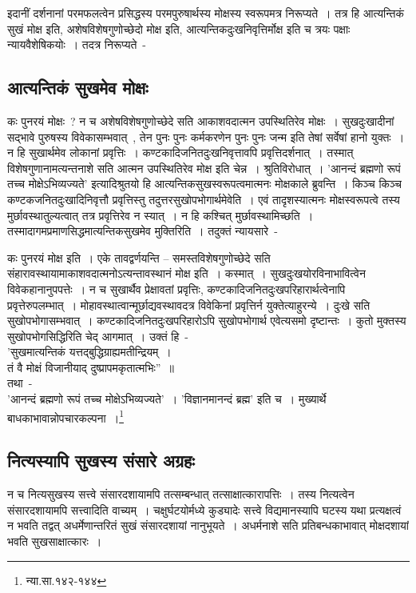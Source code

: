 	इदानीं दर्शनानां परमफलत्वेन प्रसिद्धस्य परमपुरुषार्थस्य मोक्षस्य स्वरूपमत्र निरूप्यते~। तत्र हि आत्यन्तिकं सुखं मोक्ष इति, अशेषविशेषगुणोच्छेदो मोक्ष इति, आत्यन्तिकदुःखनिवृत्तिर्मोक्ष इति च त्रयः पक्षाः न्यायवैशेषिकयोः~। तदत्र निरूप्यते~- 

		\subsection{आत्यन्तिकं सुखमेव मोक्षः}

		कः पुनरयं मोक्षः~? न च अशेषविशेषगुणोच्छेदे सति आकाशवदात्मन उपस्थितिरेव मोक्षः~।‌ सुखदुःखादीनां सद्भावे पुरुषस्य विवेकासम्भवात्~, तेन पुनः पुनः कर्मकरणेन पुनः पुनः जन्म इति तेषां सर्वेषां हानो युक्तः~। न हि सुखार्थमेव लोकानां प्रवृत्तिः~। कण्टकादिजनितदुःखनिवृत्तावपि प्रवृत्तिदर्शनात्~। तस्मात् विशेषगुणानामत्यन्तनाशे सति आत्मन उपस्थितिरेव मोक्ष इति चेन्न~। श्रुतिविरोधात्~। ’आनन्दं ब्रह्मणो रूपं तच्च मोक्षेऽभिव्यज्यते’ इत्यादिश्रुतयो हि आत्यन्तिकसुखस्वरूपत्वमात्मनः मोक्षकाले ब्रुवन्ति~। किञ्च किञ्च कण्टकजनितदुःखादिनिवृत्तौ प्रवृत्तिस्तु तदुत्तरसुखोपभोगार्थमेवेति~। एवं तादृशस्यात्मनः मोक्षस्वरूपत्वे तस्य मुर्छावस्थातुल्यत्वात् तत्र प्रवृत्तिरेव न स्यात्~। न हि कश्चित् मुर्छावस्थामिच्छति~। तस्मादागमप्रमाणसिद्धमात्यन्तिकसुखमेव मुक्तिरिति~। तदुक्तं न्यायसारे~-

		{\fontsize{11.7}{0}\selectfont\s कः पुनरयं मोक्ष इति~। एके तावद्वर्णयन्ति – समस्तविशेषगुणोच्छेदे सति संहारावस्थायामाकाशवदात्मनोऽत्यन्तावस्थानं मोक्ष इति~। कस्मात्~। सुखदुःखयोरविनाभावित्वेन विवेकहानानुपपत्तेः~। न च सुखार्थैव प्रेक्षावतां प्रवृत्तिः, कण्टकादिजनितदुःखपरिहारार्थत्वेनापि प्रवृत्तेरुपलम्भात्~। मोहावस्थात्वान्मूर्छाद्यवस्थावदत्र विवेकिनां प्रवृत्तिर्न युक्तेत्याहुरन्ये~। दुःखे सति सुखोपभोगासम्भवात्~। कण्टकादिजनितदुःखपरिहारोऽपि सुखोपभोगार्थ एवेत्यसमो दृष्टान्तः~। कुतो मुक्तस्य सुखोपभोगसिद्धिरिति चेद् आगमात्~। उक्तं हि~-\\ ’सुखमात्यन्तिकं यत्तद्बुद्धिग्राह्यमतीन्द्रियम्~।\\ तं वै मोक्षं विजानीयाद् दुष्प्रापमकृतात्मभिः”~॥\\ तथा~- \\ ’आनन्दं ब्रह्मणो रूपं तच्च मोक्षेऽभिव्यज्यते’~। ’विज्ञानमानन्दं ब्रह्म’ इति च~। मुख्यार्थे बाधकाभावान्नोपचारकल्पना~।\footnote{न्या.सा.१४२-१४४}}

		\subsection{नित्यस्यापि सुखस्य संसारे अग्रहः}

		न च नित्यसुखस्य सत्त्वे संसारदशायामपि तत्सम्बन्धात् तत्साक्षात्कारापत्तिः~।‌ तस्य नित्यत्वेन संसारदशायामपि सत्त्वादिति वाच्यम्~। चक्षुर्घटयोर्मध्ये कुड्यादेः सत्त्वे विद्यमानस्यापि घटस्य यथा प्रत्यक्षत्वं न भवति तद्वत् अधर्मेणान्तरितं सुखं संसारदशायां नानुभूयते~। अधर्मनाशे सति प्रतिबन्धकाभावात् मोक्षदशायां भवति सुखसाक्षात्कारः~। 

